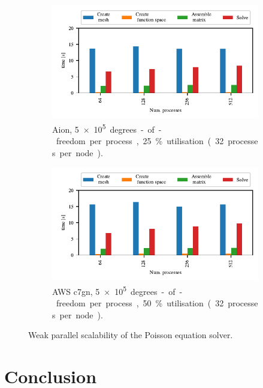 \begin{figure}
    \begin{subfigure}{.7\textwidth}
        \centering
        \includegraphics{chapters/chp1/graphics/parallel_scaling_plots/output/weak_scaling_aion_poisson.pdf}
        \caption{Aion, \SI{5e+5} degrees-of-freedom per process, 25 \% utilisation (32 processes per node).}
        \label{fig:weak-scaling-aion}
    \end{subfigure}

    \begin{subfigure}{.7\textwidth}
        \centering
        \includegraphics{chapters/chp1/graphics/parallel_scaling_plots/output/weak_scaling_aws_c7gn_poisson.pdf}
        \caption{AWS c7gn, \SI{5e+5} degrees-of-freedom per process, 50 \% utilisation (32 processes per node).}
        \label{fig:weak-scaling-aws}
    \end{subfigure}
    \caption{Weak parallel scalability of the Poisson equation solver.}
    \label{fig:weak-scaling}
\end{figure}

\section*{Conclusion}

